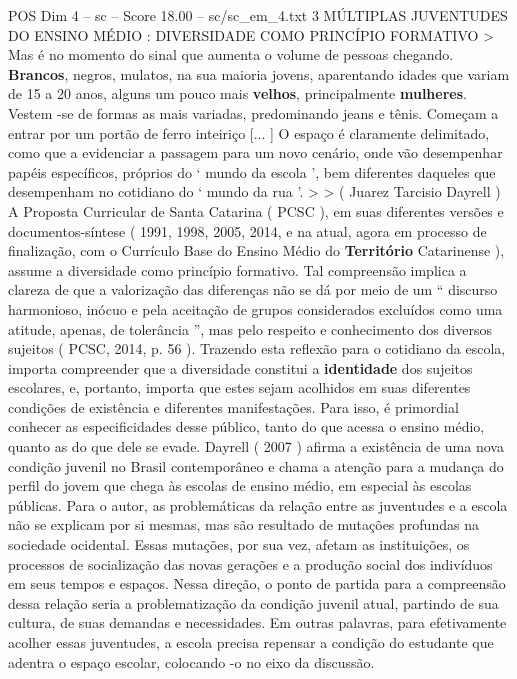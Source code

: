 \begin{textsample}{POS Dim 4 – sc – Score 18.00 – sc/sc\_em\_4.txt}  \label{ex:f4_pos_038}
3 MÚLTIPLAS JUVENTUDES DO ENSINO MÉDIO : DIVERSIDADE COMO PRINCÍPIO FORMATIVO > Mas é no momento do sinal que aumenta o volume de pessoas chegando. \textbf{Brancos}, negros, mulatos, na sua maioria jovens, aparentando idades que variam de 15 a 20 anos, alguns um pouco mais \textbf{velhos}, principalmente \textbf{mulheres}.
Vestem -se de formas as mais variadas, predominando jeans e tênis.
Começam a entrar por um portão de ferro inteiriço [... ] O espaço é claramente delimitado, como que a evidenciar a passagem para um novo cenário, onde vão desempenhar papéis específicos, próprios do ‘ mundo da escola ’, bem diferentes daqueles que desempenham no cotidiano do ‘ mundo da rua ’. > > ( Juarez Tarcisio Dayrell ) A Proposta Curricular de Santa Catarina ( PCSC ), em suas diferentes versões e documentos-síntese ( 1991, 1998, 2005, 2014, e na atual, agora em processo de finalização, com o Currículo Base do Ensino Médio do \textbf{Território} Catarinense ), assume a diversidade como princípio formativo.
Tal compreensão implica a clareza de que a valorização das diferenças não se dá por meio de um “ discurso harmonioso, inócuo e pela aceitação de grupos considerados excluídos como uma atitude, apenas, de tolerância ”, mas pelo respeito e conhecimento dos diversos sujeitos ( PCSC, 2014, p. 56 ).
Trazendo esta reflexão para o cotidiano da escola, importa compreender que a diversidade constitui a \textbf{identidade} dos sujeitos escolares, e, portanto, importa que estes sejam acolhidos em suas diferentes condições de existência e diferentes manifestações.
Para isso, é primordial conhecer as especificidades desse público, tanto do que acessa o ensino médio, quanto as do que dele se evade.
Dayrell ( 2007 ) afirma a existência de uma nova condição juvenil no Brasil contemporâneo e chama a atenção para a mudança do perfil do jovem que chega às escolas de ensino médio, em especial às escolas públicas.
Para o autor, as problemáticas da relação entre as juventudes e a escola não se explicam por si mesmas, mas são resultado de mutações profundas na sociedade ocidental.
Essas mutações, por sua vez, afetam as instituições, os processos de socialização das novas gerações e a produção social dos indivíduos em seus tempos e espaços.
Nessa direção, o ponto de partida para a compreensão dessa relação seria a problematização da condição juvenil atual, partindo de sua cultura, de suas demandas e necessidades.
Em outras palavras, para efetivamente acolher essas juventudes, a escola precisa repensar a condição do estudante que adentra o espaço escolar, colocando -o no eixo da discussão.

\end{textsample}
